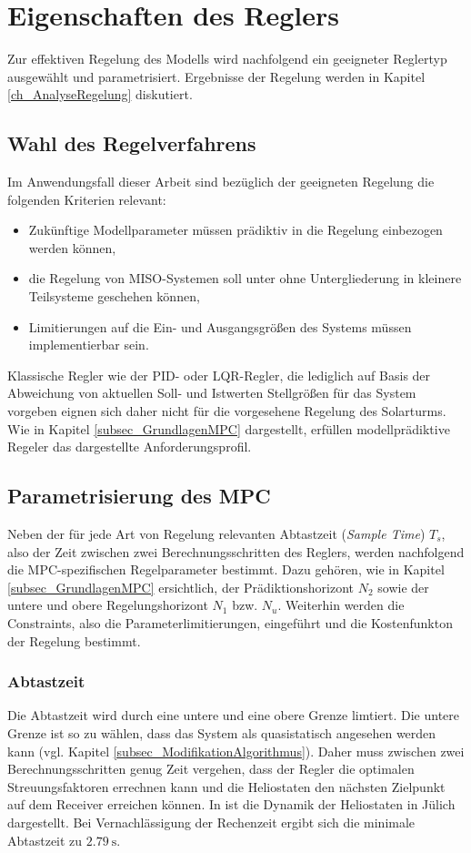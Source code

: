 \section{Eigenschaften des Reglers} \label{sec_Reglereigenschaften}
Zur effektiven Regelung des Modells wird nachfolgend ein geeigneter Reglertyp ausgewählt und parametrisiert.
Ergebnisse der Regelung werden in Kapitel \ref{ch_AnalyseRegelung} diskutiert.


\subsection{Wahl des Regelverfahrens} \label{subsec_ReglerverfahrenWahl}
Im Anwendungsfall dieser Arbeit sind bezüglich der geeigneten Regelung die folgenden Kriterien relevant:
\begin{itemize}
    \item Zukünftige Modellparameter müssen prädiktiv in die Regelung einbezogen werden können,
    \item die Regelung von MISO-Systemen soll unter ohne Untergliederung in kleinere Teilsysteme geschehen können,
    \item Limitierungen auf die Ein- und Ausgangsgrößen des Systems müssen implementierbar sein.
\end{itemize}
Klassische Regler wie der PID- oder LQR-Regler, die lediglich auf Basis der Abweichung von aktuellen Soll- und Istwerten Stellgrößen für das System vorgeben \cite[S.408]{Lunze} eignen sich daher nicht für die vorgesehene Regelung des Solarturms.
Wie in Kapitel \ref{subsec_GrundlagenMPC} dargestellt, erfüllen modellprädiktive Regeler das dargestellte Anforderungsprofil.


\subsection{Parametrisierung des MPC} \label{subsec_ParameterMPC}
Neben der für jede Art von Regelung relevanten Abtastzeit (\textit{Sample Time}) $T_s$, also der Zeit zwischen zwei Berechnungsschritten des Reglers, werden nachfolgend die MPC-spezifischen Regelparameter bestimmt.
Dazu gehören, wie in Kapitel \ref{subsec_GrundlagenMPC} ersichtlich, der Prädiktionshorizont $N_2$ sowie der untere und obere Regelungshorizont $N_1$ bzw. $N_u$.
Weiterhin werden die Constraints, also die Parameterlimitierungen, eingeführt und die Kostenfunkton der Regelung bestimmt.

\subsubsection*{Abtastzeit} \label{subsubsec_sampletime}
Die Abtastzeit wird durch eine untere und eine obere Grenze limtiert.
Die untere Grenze ist so zu wählen, dass das System als quasistatisch angesehen werden kann (vgl. Kapitel \ref{subsec_ModifikationAlgorithmus}).
Daher muss zwischen zwei Berechnungsschritten genug Zeit vergehen, dass der Regler die optimalen Streuungsfaktoren errechnen kann und die Heliostaten den nächsten Zielpunkt auf dem Receiver erreichen können.
In \cite[S.25-26]{DissZanger} ist die Dynamik der Heliostaten in Jülich dargestellt.
Bei Vernachlässigung der Rechenzeit ergibt sich die minimale Abtastzeit zu $\SI{2.79}{\second}$.

